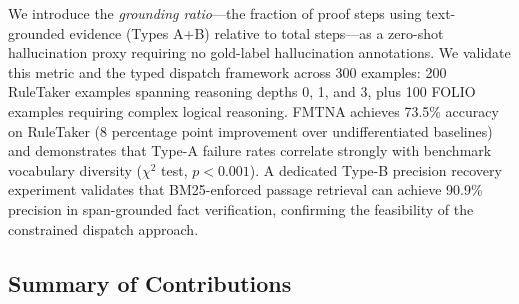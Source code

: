 \documentclass[11pt,letterpaper]{article}
\begin{document}
We introduce the \emph{grounding ratio}---the fraction of proof steps using text-grounded evidence (Types A+B) relative to total steps---as a zero-shot hallucination proxy requiring no gold-label hallucination annotations. We validate this metric and the typed dispatch framework across 300 examples: 200 RuleTaker examples spanning reasoning depths 0, 1, and 3, plus 100 FOLIO examples requiring complex logical reasoning. FMTNA achieves 73.5\% accuracy on RuleTaker (8 percentage point improvement over undifferentiated baselines) and demonstrates that Type-A failure rates correlate strongly with benchmark vocabulary diversity ($\chi^2$ test, $p{<}0.001$). A dedicated Type-B precision recovery experiment validates that BM25-enforced passage retrieval can achieve 90.9\% precision in span-grounded fact verification, confirming the feasibility of the constrained dispatch approach.

\subsection*{Summary of Contributions}
\end{document}
